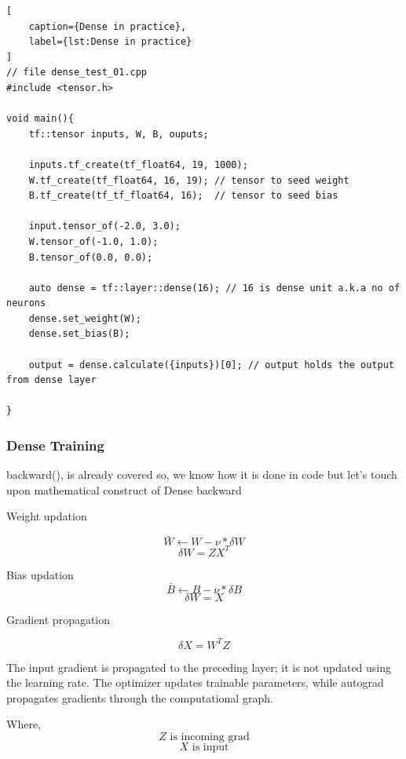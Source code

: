 \begin{lstlisting}[
    caption={Dense in practice},
    label={lst:Dense in practice}
]
// file dense_test_01.cpp
#include <tensor.h>

void main(){
    tf::tensor inputs, W, B, ouputs;

    inputs.tf_create(tf_float64, 19, 1000);
    W.tf_create(tf_float64, 16, 19); // tensor to seed weight
    B.tf_create(tf_tf_float64, 16);  // tensor to seed bias

    input.tensor_of(-2.0, 3.0);
    W.tensor_of(-1.0, 1.0);
    B.tensor_of(0.0, 0.0);

    auto dense = tf::layer::dense(16); // 16 is dense unit a.k.a no of neurons
    dense.set_weight(W);
    dense.set_bias(B);

    output = dense.calculate({inputs})[0]; // output holds the output from dense layer

}
\end{lstlisting}

\subsubsection{Dense Training}

backward(), is already covered so, we know
how it is done in code but let's touch upon
mathematical construct of Dense backward

Weight updation

\[ \bar{W} \leftarrow W - \nu * {\delta{W}} \]
\[ {\delta{W}} = ZX^T \]

Bias updation
\[ \bar{B} \leftarrow B - \nu * {\delta{B}} \]
\[ {\delta{W}} = X \]

Gradient propagation

\[ {\delta{X}} = W^TZ \]

The input gradient is propagated to the preceding
layer; it is not updated using the learning rate.
The optimizer updates trainable parameters, while
autograd propagates gradients through the
computational graph.


Where,
\[ Z \text{ is incoming grad} \]
\[ X \text{ is input} \]


